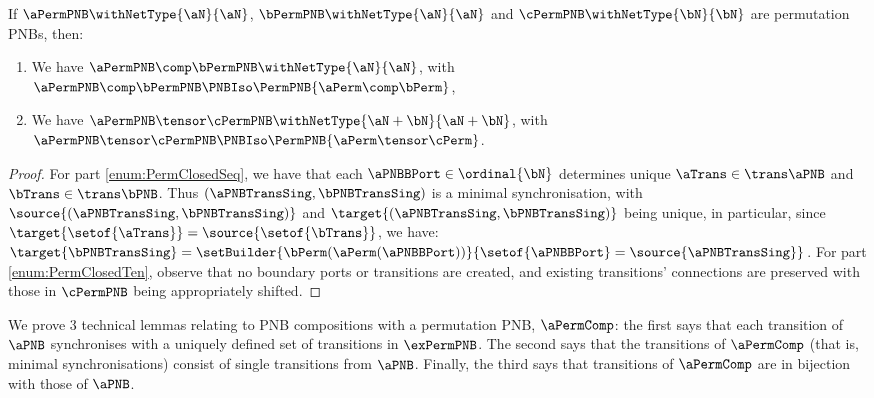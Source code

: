 \begin{lemma}
    If $\aPermPNB \withNetType{\aN}{\aN}$, $\bPermPNB \withNetType{\aN}{\aN}$ and
    $\cPermPNB \withNetType{\bN}{\bN}$ are permutation PNBs, then:
    \begin{enumerate}
        \item \label{enum:PermClosedSeq}
            We have $\aPermPNB \comp \bPermPNB \withNetType{\aN}{\aN}$, with $\aPermPNB \comp
            \bPermPNB \PNBIso \PermPNB{\aPerm \comp \bPerm}$,
        \item \label{enum:PermClosedTen}
            We have $\aPermPNB \tensor \cPermPNB \withNetType{\aN+\bN}{\aN + \bN}$, with
            $\aPermPNB \tensor \cPermPNB \PNBIso \PermPNB{\aPerm \tensor \cPerm}$.
    \end{enumerate}
    \label{lem:permutationPNBClosedComposition}
\end{lemma}
\begin{proof}
    \newcommand{\abMinSync}{(\aPNBTransSing, \bPNBTransSing)}
    For part \ref{enum:PermClosedSeq}, we have that each $\aPNBBPort \in
    \ordinal{\bN}$ determines unique $\aTrans \in \trans\aPNB$ and
    $\bTrans \in \trans\bPNB$. Thus $\abMinSync$ is a minimal
    synchronisation, with $\source{\abMinSync}$ and $\target{\abMinSync}$ being
    unique, in particular, since $\target{\setof{\aTrans}} =
    \source{\setof{\bTrans}}$, we have: $\target{\bPNBTransSing} =
    \setBuilder{\bPerm(\aPerm(\aPNBBPort))}{\setof{\aPNBBPort} =
    \source{\aPNBTransSing}}$. For part \ref{enum:PermClosedTen}, observe that
    no boundary ports or transitions are created, and existing transitions'
    connections are preserved with those in $\cPermPNB$ being appropriately
    shifted.
\end{proof}

We prove 3 technical lemmas relating to PNB compositions with a permutation
PNB, $\aPermComp$: the first says that each transition of $\aPNB$ synchronises
with a uniquely defined set of transitions in $\exPermPNB$. The second says
that the transitions of $\aPermComp$ (that is, minimal synchronisations)
consist of single transitions from $\aPNB$. Finally, the third says that
transitions of $\aPermComp$ are in bijection with those of $\aPNB$.

